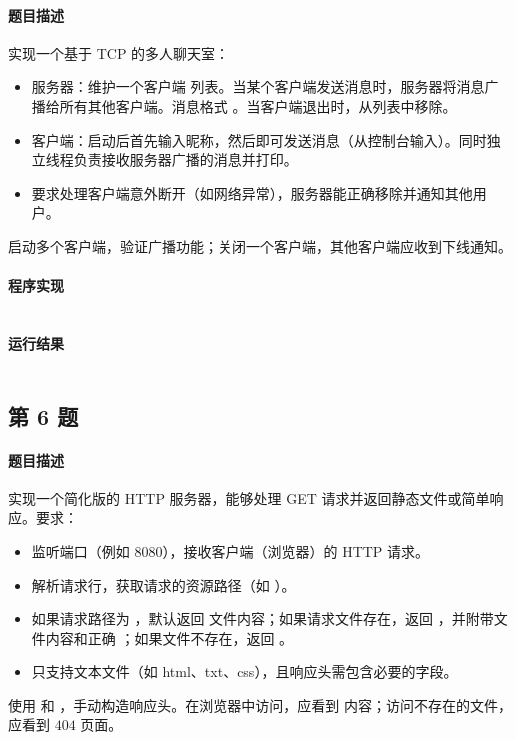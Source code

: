 \documentclass{academics}
\begin{document}
\paragraph{题目描述} {
    实现一个基于 TCP 的多人聊天室：
    \begin{itemize}
        \item 服务器：维护一个客户端  列表。当某个客户端发送消息时，服务器将消息广播给所有其他客户端。消息格式 。当客户端退出时，从列表中移除。
        \item 客户端：启动后首先输入昵称，然后即可发送消息（从控制台输入）。同时独立线程负责接收服务器广播的消息并打印。
        \item 要求处理客户端意外断开（如网络异常），服务器能正确移除并通知其他用户。
    \end{itemize}
    启动多个客户端，验证广播功能；关闭一个客户端，其他客户端应收到下线通知。
}

\paragraph{程序实现} {
    \inputminted[label=ChatRoom.java]{java}{../src/P05/ChatRoom.java}
}

\paragraph{运行结果} {
    \inputminted{text}{../res/P05.out}
}

\subsection{第 6 题}

\paragraph{题目描述} {
    实现一个简化版的 HTTP 服务器，能够处理 GET 请求并返回静态文件或简单响应。要求：
    \begin{itemize}
        \item 监听端口（例如 $8080$），接收客户端（浏览器）的 HTTP 请求。
        \item 解析请求行，获取请求的资源路径（如 ）。
        \item 如果请求路径为 \mil{/}，默认返回  文件内容；如果请求文件存在，返回 ，并附带文件内容和正确 ；如果文件不存在，返回 。
        \item 只支持文本文件（如 html、txt、css），且响应头需包含必要的字段。
    \end{itemize}
    使用  和 ，手动构造响应头。在浏览器中访问，应看到  内容；访问不存在的文件，应看到 $404$ 页面。
}
\end{document}
